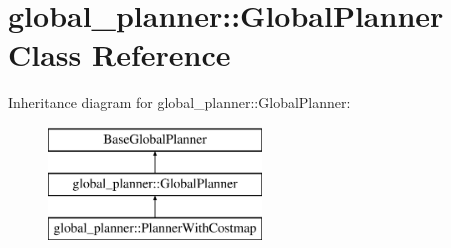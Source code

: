 \hypertarget{classglobal__planner_1_1_global_planner}{}\section{global\+\_\+planner\+:\+:Global\+Planner Class Reference}
\label{classglobal__planner_1_1_global_planner}
Inheritance diagram for global\+\_\+planner\+:\+:Global\+Planner\+:\begin{figure}[H]
\begin{center}
\leavevmode
\includegraphics[height=3.000000cm]{classglobal__planner_1_1_global_planner}
\end{center}
\end{figure}
